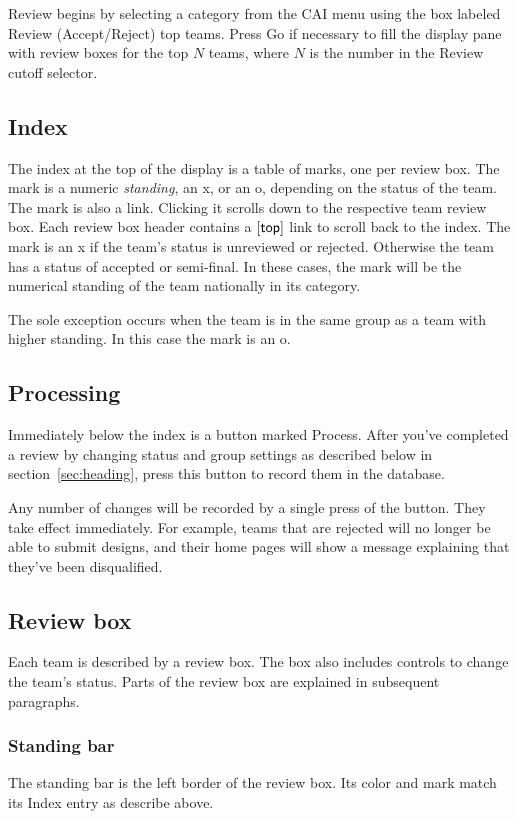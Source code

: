 \documentclass[11pt,letterpaper]{refart}
\def\ui#1{\textsf{#1}}
\begin{document}
Review begins by selecting a category from the CAI menu using the box labeled
\ui{Review (Accept/Reject) top teams}. Press \ui{Go} if necessary to fill
the display pane with review boxes for the top $N$ teams, where $N$ is the number
in the \ui{Review cutoff} selector. 

\subsection{Index}
The index at the top of the display is a table of marks, one per review box. The 
mark is a numeric \emph{standing}, an \ui{x}, or an \ui{o}, depending on the status of
the team. The mark is also a link. Clicking it scrolls down to the respective team
review box. Each review box header contains a $[\hbox{\ui{top}}]$ link to scroll
back to the index. The mark is an \ui{x} if the team's status is unreviewed or
rejected. Otherwise the team has a status of accepted or semi-final. In these 
cases, the mark will be the numerical standing of the team nationally in its
category.

The sole exception occurs when the team is in the same group as a 
team with higher standing. In this case the mark is an \ui{o}.

\subsection{Processing}
Immediately below the index is a button marked \ui{Process}. After you've 
completed a review by changing status and group settings as described below
in section~\ref{sec:heading}, press this button to record them in the database. 

Any number of changes will be recorded by a single press of the button.
They take effect immediately. For example, teams that are rejected will no longer be 
able to submit designs, and their home pages will show a message explaining that 
they've been disqualified.

\subsection{Review box}
Each team is described by a review box. The box also includes controls to change
the team's status. Parts of the review box are explained in subsequent paragraphs.

\subsubsection{Standing bar}
The standing bar is the left border of the review box. Its color and mark match
its Index entry as describe above. 
\end{document}
